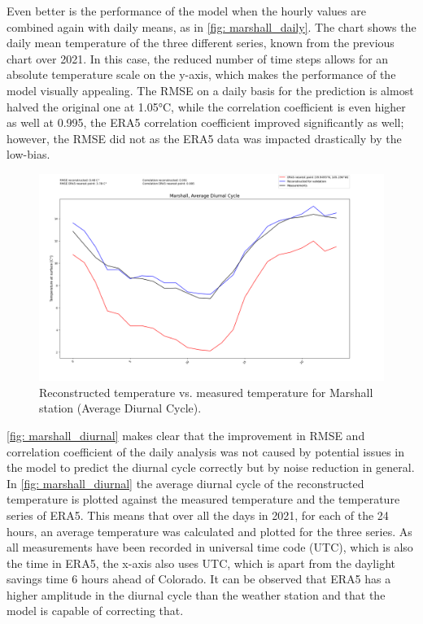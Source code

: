 Even better is the performance of the model when the hourly values are combined again with daily means, as in \autoref{fig: marshall_daily}.
The chart shows the daily mean temperature of the three different series, known from the previous chart over 2021.
In this case, the reduced number of time steps allows for an absolute temperature scale on the y-axis, which makes the performance of the model visually appealing.
The RMSE on a daily basis for the prediction is almost halved the original one at 1.05°C, while the correlation coefficient is even higher as well at 0.995, the ERA5 correlation coefficient improved significantly as well; however, the RMSE did not as the ERA5 data was impacted drastically by the low-bias.

\begin{figure}
    \centering
    \includegraphics[width=1.00\textwidth]{resources/images/charts/marshall_eval_grib_final/Marshall, Average Diurnal Cycle.png}
    \caption{Reconstructed temperature vs. measured temperature for Marshall station (Average Diurnal Cycle).}
    \label{fig: marshall_diurnal}
\end{figure}

\autoref{fig: marshall_diurnal} makes clear that the improvement in RMSE and correlation coefficient of the daily analysis was not caused by potential issues in the model to predict the diurnal cycle correctly but by noise reduction in general.
In \autoref{fig: marshall_diurnal} the average diurnal cycle of the reconstructed temperature is plotted against the measured temperature and the temperature series of ERA5.
This means that over all the days in 2021, for each of the 24 hours, an average temperature was calculated and plotted for the three series.
As all measurements have been recorded in universal time code (UTC), which is also the time in ERA5, the x-axis also uses UTC, which is apart from the daylight savings time 6 hours ahead of Colorado.
It can be observed that ERA5 has a higher amplitude in the diurnal cycle than the weather station and that the model is capable of correcting that.

